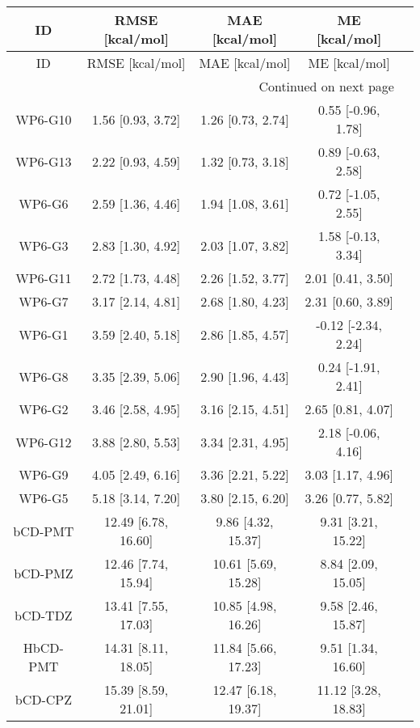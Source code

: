 \documentclass[8pt]{article}
\begin{document}
\begin{center}
\begin{footnotesize}
\begin{longtable}{|ccccc|}
\toprule
      ID &     RMSE [kcal/mol] &      MAE [kcal/mol] &       ME [kcal/mol] \\
\midrule
\endfirsthead

\toprule
      ID &     RMSE [kcal/mol] &      MAE [kcal/mol] &       ME [kcal/mol] \\
\midrule
\endhead
\midrule
\multicolumn{4}{r}{{Continued on next page}} \\
\midrule
\endfoot

\bottomrule
\endlastfoot
 WP6-G10 &   1.56 [0.93, 3.72] &   1.26 [0.73, 2.74] &  0.55 [-0.96, 1.78] \\
 WP6-G13 &   2.22 [0.93, 4.59] &   1.32 [0.73, 3.18] &  0.89 [-0.63, 2.58] \\
  WP6-G6 &   2.59 [1.36, 4.46] &   1.94 [1.08, 3.61] &  0.72 [-1.05, 2.55] \\
  WP6-G3 &   2.83 [1.30, 4.92] &   2.03 [1.07, 3.82] &  1.58 [-0.13, 3.34] \\
 WP6-G11 &   2.72 [1.73, 4.48] &   2.26 [1.52, 3.77] &   2.01 [0.41, 3.50] \\
  WP6-G7 &   3.17 [2.14, 4.81] &   2.68 [1.80, 4.23] &   2.31 [0.60, 3.89] \\
  WP6-G1 &   3.59 [2.40, 5.18] &   2.86 [1.85, 4.57] & -0.12 [-2.34, 2.24] \\
  WP6-G8 &   3.35 [2.39, 5.06] &   2.90 [1.96, 4.43] &  0.24 [-1.91, 2.41] \\
  WP6-G2 &   3.46 [2.58, 4.95] &   3.16 [2.15, 4.51] &   2.65 [0.81, 4.07] \\
 WP6-G12 &   3.88 [2.80, 5.53] &   3.34 [2.31, 4.95] &  2.18 [-0.06, 4.16] \\
  WP6-G9 &   4.05 [2.49, 6.16] &   3.36 [2.21, 5.22] &   3.03 [1.17, 4.96] \\
  WP6-G5 &   5.18 [3.14, 7.20] &   3.80 [2.15, 6.20] &   3.26 [0.77, 5.82] \\
 bCD-PMT & 12.49 [6.78, 16.60] &  9.86 [4.32, 15.37] &  9.31 [3.21, 15.22] \\
 bCD-PMZ & 12.46 [7.74, 15.94] & 10.61 [5.69, 15.28] &  8.84 [2.09, 15.05] \\
 bCD-TDZ & 13.41 [7.55, 17.03] & 10.85 [4.98, 16.26] &  9.58 [2.46, 15.87] \\
HbCD-PMT & 14.31 [8.11, 18.05] & 11.84 [5.66, 17.23] &  9.51 [1.34, 16.60] \\
 bCD-CPZ & 15.39 [8.59, 21.01] & 12.47 [6.18, 19.37] & 11.12 [3.28, 18.83] \\

\end{longtable}
\end{footnotesize}
\end{center}
\end{document}
